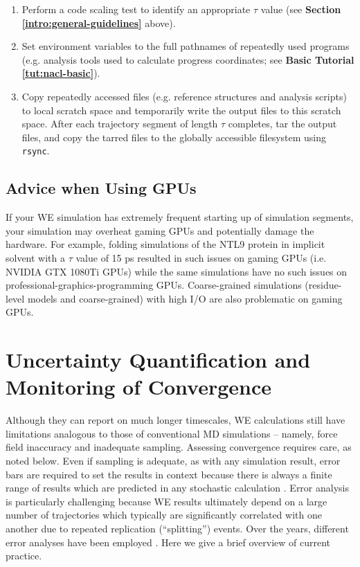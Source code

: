 \begin{enumerate}
\item Perform a code scaling test to identify an appropriate $\tau$ value (see \textbf{Section \ref{intro:general-guidelines}} above). 
\item Set environment variables to the full pathnames of repeatedly used programs (e.g. analysis tools used to calculate progress coordinates; see \textbf{Basic Tutorial \ref{tut:nacl-basic}}).  
\item Copy repeatedly accessed files (e.g. reference structures and analysis scripts) to local scratch space and temporarily write the output files to this scratch space. 
After each trajectory segment of length $\tau$ completes, tar the output files, and copy the tarred files to the globally accessible filesystem using \verb|rsync|. 
\end{enumerate}

\subsection{Advice when Using GPUs}

If your WE simulation has extremely frequent starting up of simulation segments, your simulation may overheat gaming GPUs and potentially damage the hardware. 
For example, folding simulations of the NTL9 protein in implicit solvent with a $\tau$ value of 15 ps resulted in such issues on gaming GPUs (i.e. NVIDIA GTX 1080Ti GPUs) while the same simulations have no such issues on professional-graphics-programming GPUs. 
Coarse-grained simulations (residue-level models and coarse-grained) with high I/O are also problematic on gaming GPUs. 

\section{Uncertainty Quantification and Monitoring of Convergence}

Although they can report on much longer timescales, WE calculations still have limitations analogous to those of conventional MD simulations -- namely, force field inaccuracy and inadequate sampling. 
Assessing convergence requires care, as noted below. 
Even if sampling is adequate, as with any simulation result, error bars are required to set the results in context because there is always a finite range of results which are predicted in any stochastic calculation \citep{Grossfield2019}. 
Error analysis is particularly challenging because WE results ultimately depend on a large number of trajectories which typically are significantly correlated with one another due to repeated replication (“splitting”) events. 
Over the years, different error analyses have been employed \citep{zhang_efficient_2007,zwier_efficient_2016,mostofian_statistical_2019}. 
Here we give a brief overview of current practice.

